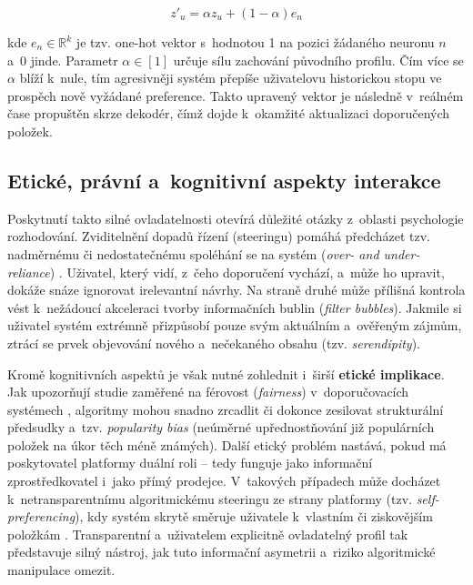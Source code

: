 \begin{equation}
z'_u = \alpha z_u + (1 - \alpha) e_n
\end{equation}

kde $e_n \in \mathbb{R}^k$ je tzv. one-hot vektor s~hodnotou 1 na pozici žádaného neuronu $n$ a~0 jinde. Parametr $\alpha \in [1]$ určuje sílu zachování původního profilu. Čím více se $\alpha$ blíží k~nule, tím agresivněji systém přepíše uživatelovu historickou stopu ve prospěch nově vyžádané preference. Takto upravený vektor je následně v~reálném čase propuštěn skrze dekodér, čímž dojde k~okamžité aktualizaci doporučených položek.

\subsection{Etické, právní a~kognitivní aspekty interakce}
\label{subsec:etika_pravo_kognice}

Poskytnutí takto silné ovladatelnosti otevírá důležité otázky z~oblasti psychologie rozhodování. Zviditelnění dopadů řízení (steeringu) pomáhá předcházet tzv. nadměrnému či nedostatečnému spoléhání se na systém (\textit{over- and under-reliance}) \cite{Tintarev2012}. Uživatel, který vidí, z~čeho doporučení vychází, a~může ho upravit, dokáže snáze ignorovat irelevantní návrhy. Na straně druhé může přílišná kontrola vést k~nežádoucí akceleraci tvorby informačních bublin (\textit{filter bubbles}). Jakmile si uživatel systém extrémně přizpůsobí pouze svým aktuálním a~ověřeným zájmům, ztrácí se prvek objevování nového a~nečekaného obsahu (tzv. \textit{serendipity}). 

Kromě kognitivních aspektů je však nutné zohlednit i~širší \textbf{etické implikace}. Jak upozorňují studie zaměřené na férovost (\textit{fairness}) v~doporučovacích systémech \cite{Ekstrand2022_Fairness}, algoritmy mohou snadno zrcadlit či dokonce zesilovat strukturální předsudky a~tzv. \textit{popularity bias} (neúměrné upřednostňování již populárních položek na úkor těch méně známých). Další etický problém nastává, pokud má poskytovatel platformy duální roli -- tedy funguje jako informační zprostředkovatel i~jako přímý prodejce. V~takových případech může docházet k~netransparentnímu algoritmickému steeringu ze strany platformy (tzv. \textit{self-preferencing}), kdy systém skrytě směruje uživatele k~vlastním či ziskovějším položkám \cite{Chen2024}. Transparentní a~uživatelem explicitně ovladatelný profil tak představuje silný nástroj, jak tuto informační asymetrii a~riziko algoritmické manipulace omezit.


